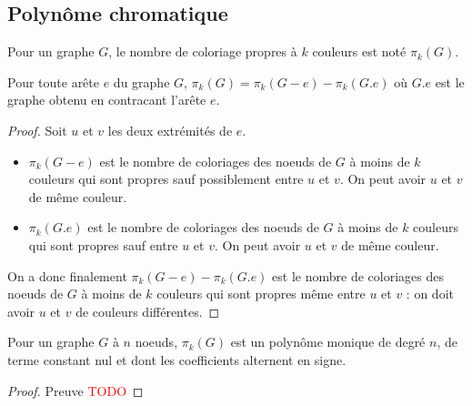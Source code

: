 \subsection{Polynôme chromatique}
Pour un graphe $G$, le nombre de coloriage propres à $k$ couleurs est noté $\pi_k(G)$.
\begin{mytheo}
  Pour toute arête $e$ du graphe $G$, $\pi_k(G) = \pi_k(G-e) - \pi_k(G.e)$ où $G.e$ est le graphe obtenu en contracant l'arête $e$.
  \begin{proof}
  Soit $u$ et $v$ les deux extrémités de $e$.
	\begin{itemize}
	\item $\pi_k(G-e)$ est le nombre de coloriages des noeuds de $G$ à moins de $k$ couleurs qui sont propres sauf possiblement entre $u$ et $v$. On peut avoir $u$ et $v$ de même couleur.
	\item $\pi_k(G.e)$ est le nombre de coloriages des noeuds de $G$ à moins de $k$ couleurs qui sont propres sauf entre $u$ et $v$. On peut avoir $u$ et $v$ de même couleur.
	\end{itemize}
	On a donc finalement $\pi_k(G-e) - \pi_k(G.e)$ est le nombre de coloriages des noeuds de $G$ à moins de $k$ couleurs qui sont propres même entre $u$ et $v$ : on doit avoir $u$ et $v$ de couleurs différentes.
  \end{proof}
\end{mytheo}

\begin{mycorr} [Birkhoff]
  Pour un graphe $G$ à $n$ noeuds, $\pi_k (G)$ est un polynôme monique de degré $n$, de terme constant nul et dont les coefficients alternent en signe.
  \begin{proof}
    Preuve \textcolor{red}{TODO}
  \end{proof}
\end{mycorr}